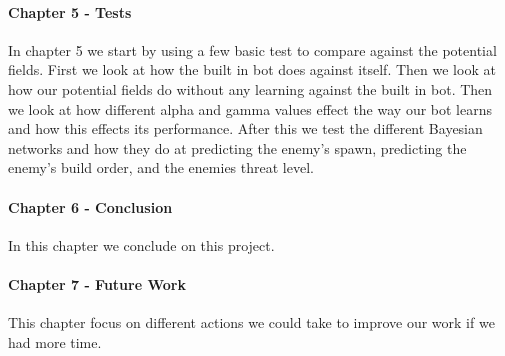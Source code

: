 \paragraph*{Chapter 5 - Tests}
In chapter 5 we start by using a few basic test to compare against the potential fields. First we look at how the built in bot does against itself. Then we look at how our potential fields do without any learning against the built in bot. Then we look at how different alpha and gamma values effect the way our bot learns and how this effects its performance. After this we test the different Bayesian networks and how they do at predicting the enemy's spawn, predicting the enemy's build order, and the enemies threat level.

\paragraph*{Chapter 6 - Conclusion}
In this chapter we conclude on this project.

\paragraph*{Chapter 7 - Future Work}
This chapter focus on different actions we could take to improve our work if we had more time.
